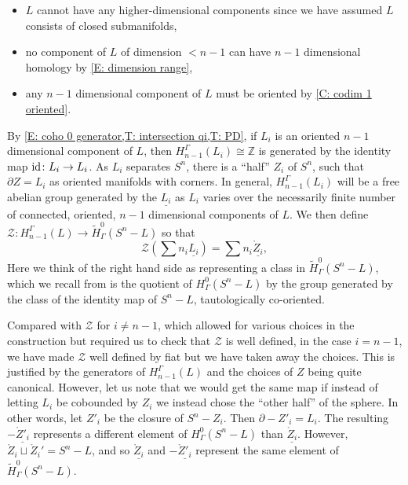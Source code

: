 \documentclass[12pt]{article}
\theoremstyle{plain}
\theoremstyle{definition}
\theoremstyle{remark}
\newcommand{\td}[1]{\tilde{#1}}
\newcommand{\Z}{\mathbb{Z}}
\newcommand{\bd}{\partial}
\newcommand{\mc}[1]{\mathcal{#1}}
\newcommand{\id}{\textup{id}}
\begin{document}
\begin{itemize}
\item $L$ cannot have any higher-dimensional components since we have assumed $L$ consists of closed submanifolds,

\item no component of $L$ of dimension $<n-1$ can have $n-1$ dimensional homology by \cref{E: dimension range},

\item any $n-1$ dimensional component of $L$ must be oriented by \cref{C: codim 1 oriented}.
\end{itemize}

By \cref{E: coho 0 generator,T: intersection qi,T: PD}, if $L_i$ is an oriented $n-1$ dimensional component of $L$, then $H_{n-1}^\Gamma(L_i) \cong \Z$ is generated by the identity map $\id \colon L_i \to L_i$.
As $L_i$ separates $S^n$, there is a ``half'' $Z_i$ of $S^n$, such that $\bd Z = L_i$ as oriented manifolds with corners.
In general, $H_{n-1}^\Gamma(L_i)$ will be a free abelian group generated by the $\underline{L_i}$ as $L_i$ varies over the necessarily finite number of connected, oriented, $n-1$ dimensional components of $L$.
We then define $\mc Z \colon H_{n-1}^\Gamma(L) \to \td H^{0}_\Gamma(S^n-L)$ so that $$\mc Z(\sum n_i \underline{L_i}) = \sum n_i \underline{\mathring Z_i},$$
Here we think of the right hand side as representing a class in $\td H^{0}_\Gamma(S^n-L)$, which we recall from \cite{D: reduced c} is the quotient of $H^{0}_\Gamma(S^n-L)$ by the group generated by the class of the identity map of $S^n-L$, tautologically co-oriented.

Compared with $\mc Z$ for $i \neq n-1$, which allowed for various choices in the construction but required us to check that $\mc Z$ is well defined, in the case $i = n-1$, we have made $\mc Z$ well defined by fiat but we have taken away the choices.
This is justified by the generators of $H_{n-1}^\Gamma(L)$ and the choices of $Z$ being quite canonical.
However, let us note that we would get the same map if instead of letting $L_i$ be cobounded by $Z_i$ we instead chose the ``other half'' of the sphere.
In other words, let $Z'_i$ be the closure of $S^n-Z_i$.
Then $\bd -Z'_i = L_i$.
The resulting $-\underline{\mathring Z'_i}$ represents a different element of $H^{0}_\Gamma(S^n-L)$ than $\underline {\mathring Z_i}$.
However, $\mathring Z_i \sqcup \mathring Z_i' = S^n-L$, and so $\underline {\mathring Z_i}$ and  $-\underline{\mathring Z'_i}$ represent the same element of $\td H^0_\Gamma(S^n - L)$.
\end{document}
